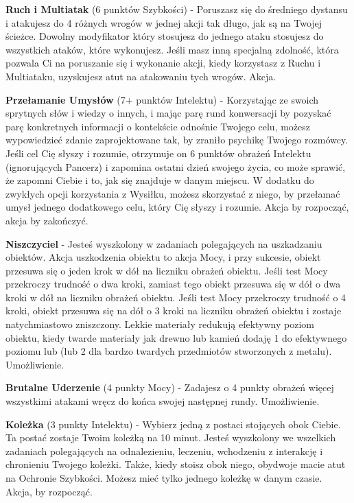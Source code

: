 \textbf{Ruch i Multiatak}\label{sec:Ruch i Multiatak} (6 punktów Szybkości) - Poruszasz się do średniego dystansu i atakujesz do 4 różnych wrogów w jednej akcji tak długo, jak są na Twojej ścieżce. Dowolny modyfikator który stosujesz do jednego ataku stosujesz do wszystkich ataków, które wykonujesz. Jeśli masz inną specjalną zdolność, która pozwala Ci na poruszanie się i wykonanie akcji, kiedy korzystasz z Ruchu i Multiataku, uzyskujesz atut na atakowaniu tych wrogów. Akcja. 

\textbf{Przełamanie Umysłów}\label{sec:Przełamanie Umysłów} (7+ punktów Intelektu) - Korzystając ze swoich sprytnych słów i wiedzy o innych, i mając parę rund konwersacji by pozyskać parę konkretnych informacji o kontekście odnośnie Twojego celu, możesz wypowiedzieć zdanie zaprojektowane tak, by zraniło psychikę Twojego rozmówcy. Jeśli cel Cię słyszy i rozumie, otrzymuje on 6 punktów obrażeń Intelektu (ignorujących Pancerz) i zapomina ostatni dzień swojego życia, co może sprawić, że zapomni Ciebie i to, jak się znajduje w danym miejscu. W dodatku do zwykłych opcji korzystania z Wysiłku, możesz skorzystać z niego, by przełamać umysł jednego dodatkowego celu, który Cię słyszy i rozumie. Akcja by rozpocząć, akcja by zakończyć.

\textbf{Niszczyciel}\label{sec:Niszczyciel} - Jesteś wyszkolony w zadaniach polegających na uszkadzaniu obiektów. Akcja uszkodzenia obiektu to akcja Mocy, i przy sukcesie, obiekt przesuwa się o jeden krok w dół na liczniku obrażeń obiektu. Jeśli test Mocy przekroczy trudność o dwa kroki, zamiast tego obiekt przesuwa się w dół o dwa kroki w dół na liczniku obrażeń obiektu. Jeśli test Mocy przekroczy trudność o 4 kroki, obiekt przesuwa się na dół o 3 kroki na liczniku obrażeń obiektu i zostaje natychmiastowo zniszczony. Lekkie materiały redukują efektywny poziom obiektu, kiedy twarde materiały jak drewno lub kamień dodaję 1 do efektywnego poziomu lub (lub 2 dla bardzo twardych przedmiotów stworzonych z metalu). Umożliwienie.

\textbf{Brutalne Uderzenie}\label{sec:Brutalne Uderzenie} (4 punkty Mocy) - Zadajesz o 4 punkty obrażeń więcej wszystkimi atakami wręcz do końca swojej następnej rundy. Umożliwienie.

\textbf{Koleżka}\label{sec:Koleżka} (3 punkty Intelektu) - Wybierz jedną z postaci stojących obok Ciebie. Ta postać zostaje Twoim koleżką na 10 minut. Jesteś wyszkolony we wszelkich zadaniach polegających na odnalezieniu, leczeniu, wchodzeniu z interakcję i chronieniu Twojego koleżki. Także, kiedy stoisz obok niego, obydwoje macie atut na Ochronie Szybkości. Możesz mieć tylko jednego koleżkę w danym czasie. Akcja, by rozpocząć. 

